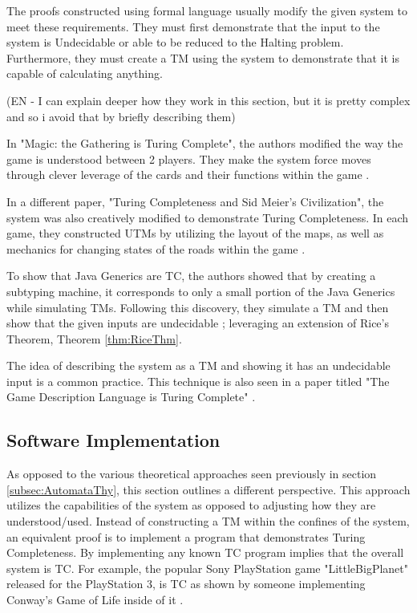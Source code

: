 The proofs constructed using formal language usually modify the given system to meet these requirements.
They must first demonstrate that the input to the system is Undecidable or able to be reduced to the Halting problem.
Furthermore, they must create a TM using the system to demonstrate that it is capable of calculating anything.

(EN - I can explain deeper how they work in this section, but it is pretty complex and so i avoid that by briefly describing them)

In "Magic: the Gathering is Turing Complete", the authors modified the way the game is understood between 2 players.
They make the system force moves through clever leverage of the cards and their functions within the game \cite{MtGTC}.

In a different paper, "Turing Completeness and Sid Meier's Civilization", the system was also creatively modified to demonstrate Turing Completeness.
In each game, they constructed UTMs by utilizing the layout of the maps, as well as mechanics for changing states of the roads within the game \cite{CivTC}.

To show that Java Generics are TC, the authors showed that by creating a subtyping machine, it corresponds to only a small portion of the Java Generics while simulating TMs.
Following this discovery, they simulate a TM and then show that the given inputs are undecidable \cite{JavaGenericsTC}; leveraging an extension of Rice's Theorem, Theorem \ref{thm:RiceThm}.

The idea of describing the system as a TM and showing it has an undecidable input is a common practice.
This technique is also seen in a paper titled "The Game Description Language is Turing Complete" \cite{GDLTC}.

\subsection{Software Implementation}\label{subsec:SoftwareImplementation}

As opposed to the various theoretical approaches seen previously in section \ref{subsec:AutomataThy}, this section outlines a different perspective.
This approach utilizes the capabilities of the system as opposed to adjusting how they are understood/used.
Instead of constructing a TM within the confines of the system, an equivalent proof is to implement a program that demonstrates Turing Completeness.
By implementing any known TC program implies that the overall system is TC.
For example, the popular Sony PlayStation game "LittleBigPlanet" released for the PlayStation 3, is TC as shown by someone implementing Conway's Game of Life inside of it \cite{LittleBigCGoL}.

